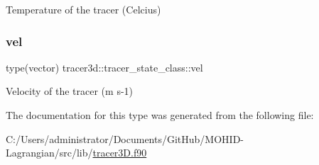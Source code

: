 Temperature of the tracer (Celcius) 

\mbox{\label{structtracer3d_1_1tracer__state__class_a4cb6681f1a9d48fbe5c2fc6f0808cdb5}} 
\subsubsection{\texorpdfstring{vel}{vel}}
{\footnotesize\ttfamily type(vector) tracer3d\+::tracer\+\_\+state\+\_\+class\+::vel\hspace{0.3cm}{\ttfamily [private]}}



Velocity of the tracer (m s-\/1) 



The documentation for this type was generated from the following file\+:\begin{DoxyCompactItemize}
\item 
C\+:/\+Users/administrator/\+Documents/\+Git\+Hub/\+M\+O\+H\+I\+D-\/\+Lagrangian/src/lib/\mbox{\hyperlink{tracer3_d_8f90}{tracer3\+D.\+f90}}\end{DoxyCompactItemize}
